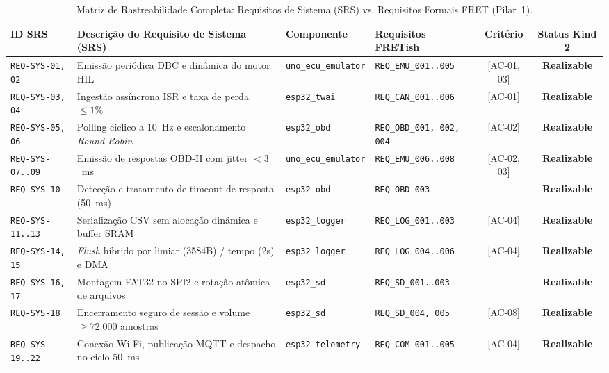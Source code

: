 \begin{table}[htbp]
\centering
\scriptsize
\caption{Matriz de Rastreabilidade Completa: Requisitos de Sistema (SRS) vs. Requisitos Formais FRET (Pilar~1).}
\label{tab:srs_fret}
\setlength{\tabcolsep}{3.5pt}
\renewcommand{\arraystretch}{1.18}
\begin{tabularx}{\textwidth}{@{} l >{\raggedright\arraybackslash}X l >{\raggedright\arraybackslash}p{3.2cm} c c @{}}
\toprule
\textbf{ID SRS} & \textbf{Descrição do Requisito de Sistema (SRS)} & \textbf{Componente} & \textbf{Requisitos FRETish} & \textbf{Critério} & \textbf{Status Kind 2} \\
\midrule
\texttt{REQ-SYS-01, 02} & Emissão periódica DBC e dinâmica do motor HIL & \texttt{uno\_ecu\_emulator} & \texttt{REQ\_EMU\_001..005} & [AC-01, 03] & \textbf{Realizable} \\
\texttt{REQ-SYS-03, 04} & Ingestão assíncrona ISR e taxa de perda $\le 1\%$ & \texttt{esp32\_twai} & \texttt{REQ\_CAN\_001..006} & [AC-01] & \textbf{Realizable} \\
\texttt{REQ-SYS-05, 06} & Polling cíclico a 10~Hz e escalonamento \textit{Round-Robin} & \texttt{esp32\_obd} & \texttt{REQ\_OBD\_001, 002, 004} & [AC-02] & \textbf{Realizable} \\
\texttt{REQ-SYS-07..09} & Emissão de respostas OBD-II com jitter $< 3$~ms & \texttt{uno\_ecu\_emulator} & \texttt{REQ\_EMU\_006..008} & [AC-02, 03] & \textbf{Realizable} \\
\texttt{REQ-SYS-10}     & Detecção e tratamento de timeout de resposta (50~ms) & \texttt{esp32\_obd} & \texttt{REQ\_OBD\_003} & -- & \textbf{Realizable} \\
\texttt{REQ-SYS-11..13} & Serialização CSV sem alocação dinâmica e buffer SRAM & \texttt{esp32\_logger} & \texttt{REQ\_LOG\_001..003} & [AC-04] & \textbf{Realizable} \\
\texttt{REQ-SYS-14, 15} & \textit{Flush} híbrido por limiar (3584B) / tempo (2s) e DMA & \texttt{esp32\_logger} & \texttt{REQ\_LOG\_004..006} & [AC-04] & \textbf{Realizable} \\
\texttt{REQ-SYS-16, 17} & Montagem FAT32 no SPI2 e rotação atômica de arquivos & \texttt{esp32\_sd} & \texttt{REQ\_SD\_001..003} & -- & \textbf{Realizable} \\
\texttt{REQ-SYS-18}     & Encerramento seguro de sessão e volume $\ge 72.000$ amostras & \texttt{esp32\_sd} & \texttt{REQ\_SD\_004, 005} & [AC-08] & \textbf{Realizable} \\
\texttt{REQ-SYS-19..22} & Conexão Wi-Fi, publicação MQTT e despacho no ciclo 50~ms & \texttt{esp32\_telemetry} & \texttt{REQ\_COM\_001..005} & [AC-04] & \textbf{Realizable} \\

\end{tabularx}
\end{table}
